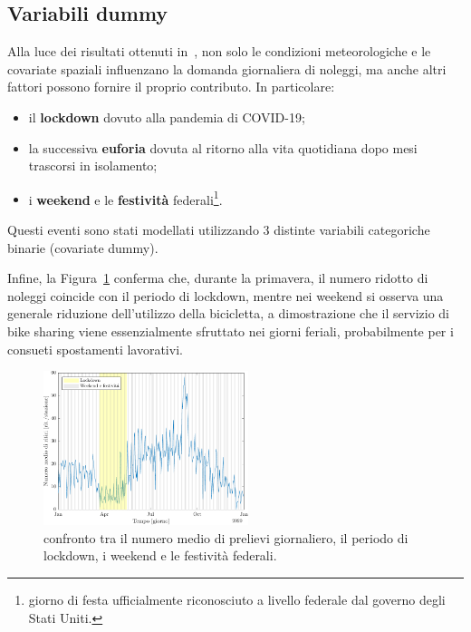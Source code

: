 \subsection[Variabili dummy]{Variabili dummy}
Alla luce dei risultati ottenuti in~\citep{paper_bike_sharing_Otto}, non solo le condizioni meteorologiche e le covariate spaziali influenzano la domanda giornaliera di noleggi, ma anche altri fattori possono fornire il proprio contributo. In particolare:
\begin{itemize}
	\item il \textbf{lockdown} dovuto alla pandemia di COVID-\num{19};
	\item la successiva \textbf{euforia} dovuta al ritorno alla vita quotidiana dopo mesi trascorsi in isolamento;
	\item i \textbf{weekend} e le \textbf{festività} federali\footnote{giorno di festa ufficialmente riconosciuto a livello federale dal governo degli Stati Uniti.}.
\end{itemize}
Questi eventi sono stati modellati utilizzando \num{3} distinte variabili categoriche binarie (covariate dummy).
\par Infine, la Figura~\ref{ritiri_vs_dummy} conferma che, durante la primavera, il numero ridotto di noleggi coincide con il periodo di lockdown, mentre nei weekend si osserva una generale riduzione dell'utilizzo della bicicletta, a dimostrazione che il servizio di bike sharing viene essenzialmente sfruttato nei giorni feriali, probabilmente per i consueti spostamenti lavorativi.

\begin{figure}[htpb]
	\centering
	\includegraphics[height=170px]{Immagini/4. Caso di studio/Serie storiche/Ritiri giornalieri e dummy}
	\caption[Confronto tra il numero medio di prelievi giornaliero, il periodo di lockdown, i weekend e le festività federali]{confronto tra il numero medio di prelievi giornaliero, il periodo di lockdown, i weekend e le festività federali.}
	\label{ritiri_vs_dummy}
\end{figure}

